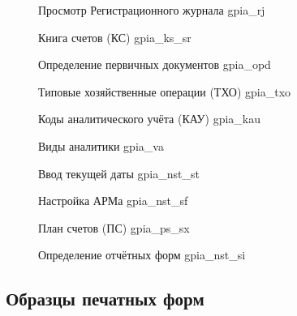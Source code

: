 \begin{figure}[!htb]
    \centering
    \caption{Просмотр Регистрационного журнала gpia\_rj}
    \label{fig:gpia_rj}
\end{figure}

\begin{figure}[!htb]
    \centering
    \caption{Книга счетов (КС) gpia\_ks\_sr}
    \label{fig:gpia_ks_sr}
\end{figure}

\begin{figure}[!htb]
    \centering
    \caption{Определение первичных документов gpia\_opd}
    \label{fig:gpia_opd}
\end{figure}

\begin{figure}[!htb]
    \centering
    \caption{Типовые хозяйственные операции (ТХО) gpia\_txo}
    \label{fig:gpia_txo}
\end{figure}

\begin{figure}[!htb]
    \centering
    \caption{Коды аналитического учёта (КАУ) gpia\_kau}
    \label{fig:gpia_kau}
\end{figure}

\begin{figure}[!htb]
    \centering
    \caption{Виды аналитики gpia\_va}
    \label{fig:gpia_va}
\end{figure}

\begin{figure}[!htb]
    \centering
    \caption{Ввод текущей даты gpia\_nst\_st}
    \label{fig:gpia_nst_st}
\end{figure}

\begin{figure}[!htb]
    \centering
    \caption{Настройка АРМа gpia\_nst\_sf}
    \label{fig:gpia_nst_sf}
\end{figure}

\begin{figure}[!htb]
    \centering
    \caption{План счетов (ПС) gpia\_ps\_sx}
    \label{fig:gpia_ps_sx}
\end{figure}

\begin{figure}[!htb]
    \centering
    \caption{Определение отчётных форм gpia\_nst\_si}
    \label{fig:gpia_nst_si}
\end{figure}

\newpage

\subsection{Образцы печатных форм}

